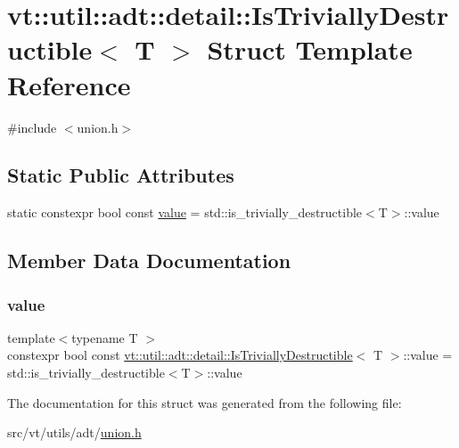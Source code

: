 \hypertarget{structvt_1_1util_1_1adt_1_1detail_1_1_is_trivially_destructible_3_01_t_01_4}{}\section{vt\+:\+:util\+:\+:adt\+:\+:detail\+:\+:Is\+Trivially\+Destructible$<$ T $>$ Struct Template Reference}
\label{structvt_1_1util_1_1adt_1_1detail_1_1_is_trivially_destructible_3_01_t_01_4}


{\ttfamily \#include $<$union.\+h$>$}

\subsection*{Static Public Attributes}
\begin{DoxyCompactItemize}
\item 
static constexpr bool const \hyperlink{structvt_1_1util_1_1adt_1_1detail_1_1_is_trivially_destructible_3_01_t_01_4_a34f124ed5ae5c3151c0570af329bde45}{value} = std\+::is\+\_\+trivially\+\_\+destructible$<$T$>$\+::value
\end{DoxyCompactItemize}


\subsection{Member Data Documentation}
\mbox{\label{structvt_1_1util_1_1adt_1_1detail_1_1_is_trivially_destructible_3_01_t_01_4_a34f124ed5ae5c3151c0570af329bde45}} 
\subsubsection{\texorpdfstring{value}{value}}
{\footnotesize\ttfamily template$<$typename T $>$ \\
constexpr bool const \hyperlink{structvt_1_1util_1_1adt_1_1detail_1_1_is_trivially_destructible}{vt\+::util\+::adt\+::detail\+::\+Is\+Trivially\+Destructible}$<$ T $>$\+::value = std\+::is\+\_\+trivially\+\_\+destructible$<$T$>$\+::value\hspace{0.3cm}{\ttfamily [static]}}



The documentation for this struct was generated from the following file\+:\begin{DoxyCompactItemize}
\item 
src/vt/utils/adt/\hyperlink{union_8h}{union.\+h}\end{DoxyCompactItemize}
